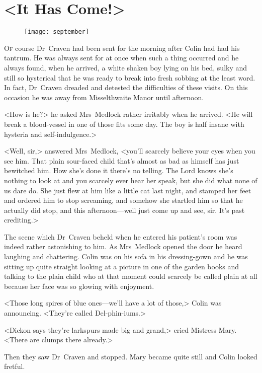 \chapter{<It Has Come!>} 
	
\begin{figure}[t!]
\centering
\texttt{[image: september]}
\end{figure}

 \lettrine[]{O}{f} course Dr~Craven had been sent for the morning after Colin had had his tantrum. He was always sent for at once when such a thing occurred and he always found, when he arrived, a white shaken boy lying on his bed, sulky and still so hysterical that he was ready to break into fresh sobbing at the least word. In fact, Dr~Craven dreaded and detested the difficulties of these visits. On this occasion he was away from Misselthwaite Manor until afternoon.

<How is he?> he asked Mrs~Medlock rather irritably when he arrived. <He will break a blood-vessel in one of those fits some day. The boy is half insane with hysteria and self-indulgence.>

<Well, sir,> answered Mrs~Medlock, <you'll scarcely believe your eyes when you see him. That plain sour-faced child that's almost as bad as himself has just bewitched him. How she's done it there's no telling. The Lord knows she's nothing to look at and you scarcely ever hear her speak, but she did what none of us dare do. She just flew at him like a little cat last night, and stamped her feet and ordered him to stop screaming, and somehow she startled him so that he actually did stop, and this afternoon—well just come up and see, sir. It's past crediting.>

The scene which Dr~Craven beheld when he entered his patient's room was indeed rather astonishing to him. As Mrs~Medlock opened the door he heard laughing and chattering. Colin was on his sofa in his dressing-gown and he was sitting up quite straight looking at a picture in one of the garden books and talking to the plain child who at that moment could scarcely be called plain at all because her face was so glowing with enjoyment.

<Those long spires of blue ones—we'll have a lot of those,> Colin was announcing. <They're called Del-phin-iums.>

<Dickon says they're larkspurs made big and grand,> cried Mistress Mary. <There are clumps there already.>

Then they saw Dr~Craven and stopped. Mary became quite still and Colin looked fretful.

